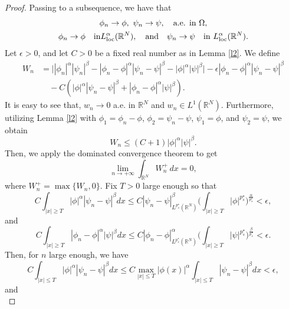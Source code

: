 \documentclass[reqno]{amsart}
\begin{document}
\begin{proof}
Passing to a subsequence, we have that
\begin{gather*}
\phi_n\to \phi,\ \psi_n\to \psi,\quad \text{a.e. in } \Omega,\\
\phi_n\to \phi\quad \text{in}  L^\alpha_{\rm loc}(\mathbb{R}^N), \quad\text{and}\quad
\psi_n\to \psi\quad \text{in } L^\alpha_{\rm loc}(\mathbb{R}^N).
\end{gather*}
Let $\epsilon>0$, and let $C>0$ be a fixed real number as in Lemma \ref{l2}. We define
\begin{equation} \label{u0}
\begin{aligned}
W_n&=\Big||\phi_n|^\alpha|\psi_n|^\beta-|\phi_n-\phi|^\alpha|\psi_n-\psi|^\beta
 -|\phi|^\alpha|\psi|^\beta\Big|-\epsilon |\phi_n-\phi|^\alpha|\psi_n-\psi|^\beta  \\
&\quad -C(|\phi|^\alpha|\psi_n-\psi|^\beta+|\phi_n-\phi|^\alpha|\psi|^\beta).
\end{aligned}
\end{equation}
It is easy to see that, $w_n\to 0$ a.e. in $\mathbb{R}^N$ and $w_n\in L^1(\mathbb{R}^N)$.
Furthermore, utilizing Lemma \ref{l2} with $\phi_1=\phi_n-\phi$, $\phi_2=\psi_n-\psi$,
$\psi_1=\phi$, and $\psi_2=\psi$, we obtain
\[
W_n\leq (C+1) |\phi|^\alpha|\psi|^\beta.
\]
Then, we apply the dominated convergence theorem to get
\begin{equation}\label{u1}
\lim_{n\to +\infty}\int_{\mathbb{R}^N}W_n^+\,dx=0,
\end{equation}
where $W_n^+=\max\lbrace W_n,0\rbrace$. Fix $T>0$ large enough so that
\begin{equation}\label{u2}
C\int_{|x|\geq T}|\phi|^\alpha|\psi_n-\psi|^\beta dx\leq C |\psi_n-\psi|^\beta_{L^{p^\star_s}(\mathbb{R}^N)}\Big(\int_{|x|\geq T}|\phi|^{p^\star_s}\Big)^\frac{\alpha}{{p^\star_s}}<\epsilon,
\end{equation}
and
\begin{equation}\label{u3}
C\int_{|x|\geq T}|\phi_n-\phi|^\alpha|\psi|^\beta dx\leq C |\phi_n-\phi|^\alpha_{L^{p^\star_s}(\mathbb{R}^N)}\Big(\int_{|x|\geq T}|\psi|^{p^\star_s}\Big)^\frac{\beta}{{p^\star_s}}<\epsilon.
\end{equation}
Then, for $n$ large enough, we have
\begin{equation}\label{u4}
C\int_{|x|\leq T}|\phi|^\alpha|\psi_n-\psi|^\beta dx\leq C \max_{|x|\leq T}|\phi(x)|^\alpha \int_{|x|\leq T}|\psi_n-\psi|^\beta dx <\epsilon,
\end{equation}
and
\begin{equation}\label{u5}

\end{equation}
\end{proof}
\end{document}
